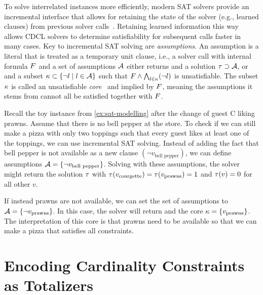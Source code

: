 To solve interrelated instances more efficiently, modern SAT solvers provide an incremental interface that allows for retaining the state of the solver (e.g., learned clauses) from previous solver calls~\autocites{DBLP:journals/entcs/EenS03,handbook2-cdcl}.
Retaining learned information this way allows CDCL solvers to determine satisfiability for subsequent calls faster in many cases.
Key to incremental SAT solving are \emph{assumptions}.
An assumption is a literal that is treated as a temporary unit clause, i.e., a solver call with internal formula $F$ and a set of assumptions $\mathcal{A}$ either returns \sat{} and a solution $\tau \supset \mathcal{A}$, or \unsat{} and a subset $\kappa \subset \{\lnot l \mid l\in\mathcal{A}\}$ such that $F \land \bigwedge_{l \in \kappa} (\lnot l)$ is unsatisfiable.
The subset $\kappa$ is called an unsatisfiable \emph{core}~\autocite{handbook2-cdcl} and implied by $F$, meaning the assumptions it stems from cannot all be satisfied together with $F$.

\begin{example}\label{ex:inc-sat}
  Recall the toy instance from \cref{ex:sat-modelling} after the change of guest C liking prawns.
  Assume that there is no bell pepper at the store.
  To check if we can still make a pizza with only two toppings such that every guest likes at least one of the toppings, we can use incremental SAT solving.
  Instead of adding the fact that bell pepper is not available as a new clause $(\lnot v_\text{bell pepper})$, we can define assumptions $\mathcal{A}=\{\lnot v_\text{bell pepper}\}$.
  Solving with these assumptions, the solver might return the solution $\tau$ with $\tau(v_\text{courgette}) = \tau(v_\text{prawns}) = 1$ and $\tau(v) = 0$ for all other $v$.

  If instead prawns are not available, we can set the set of assumptions to $\mathcal{A}=\{\lnot v_\text{prawns}\}$.
  In this case, the solver will return \unsat{} and the core $\kappa=\{v_\text{prawns}\}$.
  The interpretation of this core is that prawns need to be available so that we can make a pizza that satisfies all constraints.
\end{example}

\section{Encoding Cardinality Constraints as Totalizers\label{sec:card-const}}

